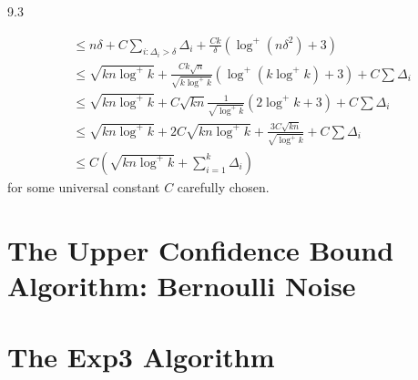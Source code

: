 \documentclass[10pt]{article}
\theoremstyle{definition}
\newenvironment{solution*}[1]{%
  \IfBlankTF{#1}
    {\renewcommand{\themanualsolutioninner}{\unskip}}
    {\renewcommand\themanualsolutioninner{#1}}%
  \manualsolutioninner
}{\endmanualsolutioninner}
\begin{document}
\begin{solution*}{9.3}
\begin{itemize}
\begin{align*}
            &\leq n \delta + C \sum_{i:\Delta_i > \delta} \Delta_i + \frac{C k}{\delta} \left(\log^+(n\delta^2) + 3 \right) \\
            &\leq \sqrt{kn \log^+ k} + \frac{C k \sqrt{n}}{\sqrt{k\log^+ k}}\left(\log^+(k\log^+ k) + 3 \right)  + C \sum \Delta_i \\
            &\leq \sqrt{kn \log^+ k} + C \sqrt{kn}\frac{1}{\sqrt{\log^+ k}}\left( 2\log^+ k + 3 \right) + C \sum \Delta_i \\
            &\leq \sqrt{kn \log^+ k} + 2C \sqrt{kn\log^+ k} + \frac{3C \sqrt{kn}}{\sqrt{\log^+ k}} + C \sum \Delta_i \\
            &\leq C \left( \sqrt{kn \log^+ k} + \sum_{i=1}^k \Delta_i \right)
        \end{align*}
        for some universal constant $C$ carefully chosen.
    \end{itemize}
\end{solution*}


\section{The Upper Confidence Bound Algorithm: Bernoulli Noise}


\section{The Exp3 Algorithm}
\end{document}
